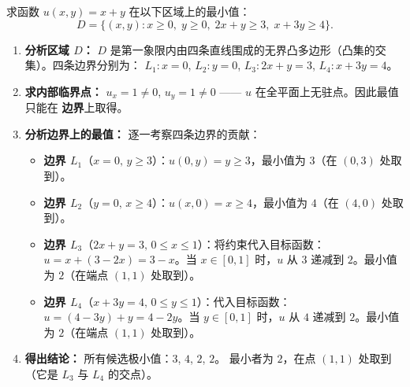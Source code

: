\documentclass[lang=cn,11pt]{elegantbook}
\begin{document}
\begin{example}[多边形域上线性函数的最值] \label{ex:linear-polygon-minimum}
求函数 $u(x,y)=x+y$ 在以下区域上的最小值：
\[
D=\{(x,y):x\geq 0,\;y\geq 0,\;2x+y\geq 3,\;x+3y\geq 4\}.
\]
\end{example}
\begin{solution}
\begin{enumerate}
  \item \textbf{分析区域 $D$：}
  $D$ 是第一象限内由四条直线围成的无界凸多边形（凸集的交集）。四条边界分别为：
  $L_1:x=0$, $L_2:y=0$, $L_3:2x+y=3$, $L_4:x+3y=4$。
  \item \textbf{求内部临界点：}
  $u_x=1 \neq 0$, $u_y=1 \neq 0$ —— $u$ 在全平面上无驻点。因此最值只能在 \textbf{边界}上取得。
  \item \textbf{分析边界上的最值：}
  逐一考察四条边界的贡献：
  \begin{itemize}
    \item \textbf{边界 $L_1$}（$x=0,\,y\geq 3$）：$u(0,y)=y\geq 3$，最小值为 $3$（在 $(0,3)$ 处取到）。
    \item \textbf{边界 $L_2$}（$y=0,\,x\geq 4$）：$u(x,0)=x\geq 4$，最小值为 $4$（在 $(4,0)$ 处取到）。
    \item \textbf{边界 $L_3$}（$2x+y=3,\,0\leq x\leq 1$）：将约束代入目标函数：$u=x+(3-2x)=3-x$。当 $x\in[0,1]$ 时，$u$ 从 $3$ 递减到 $2$。最小值为 $2$（在端点 $(1,1)$ 处取到）。
    \item \textbf{边界 $L_4$}（$x+3y=4,\,0\leq y\leq 1$）：代入目标函数：$u=(4-3y)+y=4-2y$。当 $y\in[0,1]$ 时，$u$ 从 $4$ 递减到 $2$。最小值为 $2$（在端点 $(1,1)$ 处取到）。
  \end{itemize}
  \item \textbf{得出结论：}
  所有候选极小值：$3$, $4$, $2$, $2$。
  最小者为 $\boxed{2}$，在点 $(1,1)$ 处取到（它是 $L_3$ 与 $L_4$ 的交点）。
\end{enumerate}
\end{solution}
\end{document}
